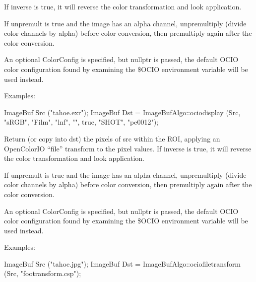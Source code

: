 If {\cf inverse} is {\cf true}, it will reverse the color transformation
and look application.

If {\cf unpremult} is {\cf true} and the image has an alpha channel,
unpremultiply (divide color channels by alpha) before color conversion, then
premultiply again after the color conversion.

An optional {\cf ColorConfig} is specified, but {\cf nullptr} is passed, the
default OCIO color configuration found by examining the {\cf \$OCIO}
environment variable will be used instead.

\smallskip
\noindent Examples:
\begin{code}
    ImageBuf Src ("tahoe.exr");
    ImageBuf Dst = ImageBufAlgo::ociodisplay (Src, "sRGB", "Film", "lnf",
                                              "", true, "SHOT", "pe0012");
\end{code}
\apiend


 
Return (or copy into {\cf dst}) the pixels of {\cf src} within the ROI,
applying an OpenColorIO ``file'' transform to the pixel values. If {\cf inverse} is {\cf
true}, it will reverse the color transformation and look application.

If {\cf unpremult} is {\cf true} and the image has an alpha channel,
unpremultiply (divide color channels by alpha) before color conversion, then
premultiply again after the color conversion.

An optional {\cf ColorConfig} is specified, but {\cf nullptr} is passed, the
default OCIO color configuration found by examining the {\cf \$OCIO}
environment variable will be used instead.

\smallskip
\noindent Examples:
\begin{code}
    ImageBuf Src ("tahoe.jpg");
    ImageBuf Dst = ImageBufAlgo::ociofiletransform (Src, "footransform.csp");
\end{code}
\apiend


